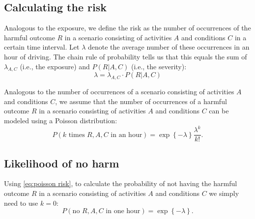 \subsection{Calculating the risk}
\label{sec:risk}

Analogous to the exposure, we define the risk as the number of occurrences of the harmful outcome $R$ in a scenario consisting of activities $A$ and conditions $C$ in a certain time interval. Let $\lambda$ denote the average number of these occurrences in an hour of driving. The chain rule of probability tells us that this equals the sum of $\lambda_{A,C}$ (i.e., the exposure) and $P(R|A,C)$ (i.e., the severity):
\begin{equation} \label{eq:risk}
	\lambda = \lambda_{A,C} \cdot P(R|A,C)
\end{equation}

Analogous to the number of occurrences of a scenario consisting of activities $A$ and conditions $C$, we assume that the number of occurrences of a harmful outcome $R$ in a scenario consisting of activities $A$ and conditions $C$ can be modeled using a Poisson distribution:
\begin{equation} \label{eq:poisson risk}
	P(k\text{ times }R,A,C\text{ in an hour}) = \exp \left\{ -\lambda \right\} \frac{\lambda^k}{k!}.
\end{equation}


\subsection{Likelihood of no harm}
\label{sec:no harm}

Using \cref{eq:poisson risk}, to calculate the probability of not having the harmful outcome $R$ in a scenario consisting of activities $A$ and conditions $C$ we simply need to use $k=0$:
\begin{equation} \label{eq:no harm}
	P(\text{no }R,A,C\text{ in one hour}) = \exp \left\{ -\lambda \right\}.
\end{equation}


